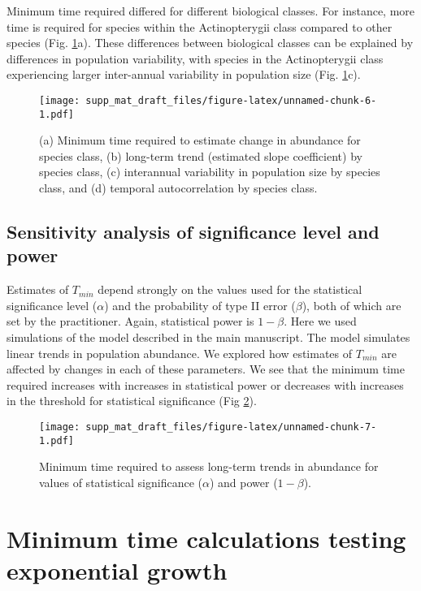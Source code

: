 \documentclass[12pt,]{article}
\begin{document}
Minimum time required differed for different biological classes. For
instance, more time is required for species within the Actinopterygii
class compared to other species (Fig. \ref{fig:class}a). These
differences between biological classes can be explained by differences
in population variability, with species in the Actinopterygii class
experiencing larger inter-annual variability in population size (Fig.
\ref{fig:class}c).

\begin{figure}[htbp]
\centering
\texttt{[image: supp\_mat\_draft\_files/figure-latex/unnamed-chunk-6-1.pdf]}
\caption{(a) Minimum time required to estimate change in abundance for
species class, (b) long-term trend (estimated slope coefficient) by
species class, (c) interannual variability in population size by species
class, and (d) temporal autocorrelation by species
class.\label{fig:class}}
\end{figure}

\pagebreak

\subsection{Sensitivity analysis of significance level and
power}\label{sensitivity-analysis-of-significance-level-and-power}

Estimates of \(T_{min}\) depend strongly on the values used for the
statistical significance level (\(\alpha\)) and the probability of type
II error (\(\beta\)), both of which are set by the practitioner. Again,
statistical power is \(1-\beta\). Here we used simulations of the model
described in the main manuscript. The model simulates linear trends in
population abundance. We explored how estimates of \(T_{min}\) are
affected by changes in each of these parameters. We see that the minimum
time required increases with increases in statistical power or decreases
with increases in the threshold for statistical significance (Fig
\ref{fig:min_time_vs_alpha_beta}).

\begin{figure}[htbp]
\centering
\texttt{[image: supp\_mat\_draft\_files/figure-latex/unnamed-chunk-7-1.pdf]}
\caption{Minimum time required to assess long-term trends in abundance
for values of statistical significance (\(\alpha\)) and power
(\(1-\beta\)).\label{fig:min_time_vs_alpha_beta}}
\end{figure}

\section{Minimum time calculations testing exponential
growth}\label{minimum-time-calculations-testing-exponential-growth}
\end{document}
